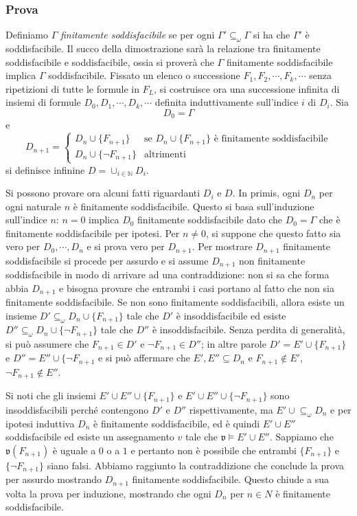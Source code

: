 \subsubsection{Prova}
Definiamo $\Gamma$ \textit{finitamente soddisfacibile} se per ogni $\Gamma' \subseteq_{\omega} \Gamma$ 
si ha che $\Gamma'$ è soddisfacibile. Il succo della dimostrazione sarà la relazione tra 
finitamente soddisfacibile e soddisfacibile, ossia 
si proverà che $\Gamma$ finitamente soddisfacibile implica $\Gamma$ soddisfacibile. 
Fissato un elenco o successione $F_1, F_2, \cdots, F_k, \cdots$ senza 
ripetizioni di tutte le formule in $F_L$, si costruisce ora una successione 
infinita di insiemi di formule $D_0, D_1, \cdots, D_k, \cdots$ definita induttivamente
sull'indice $i$ di $D_i$. Sia 
$$
D_0 = \Gamma
$$ 
e 
$$
D_{n+1} = 
\begin{cases} 
  D_n \cup \{F_{n+1}\} & \text{se } D_n \cup \{F_{n+1}\} \text{ è finitamente soddisfacibile} \\
  D_n \cup \{\neg F_{n+1}\} & \text{altrimenti}
\end{cases}
$$
si definisce infinine $D = \cup_{i \in \mathbb{N}} D_i$. 

Si possono provare ora alcuni fatti riguardanti $D_i$ e $D$. In primis, 
ogni $D_n$ per ogni naturale $n$ è finitamente soddisfacibile. Questo si basa 
sull'induzione sull'indice $n$: $n = 0$ implica $D_0$ finitamente soddisfacibile 
dato che $D_0 = \Gamma$ che è finitamente soddisfacibile per ipotesi. Per $n \neq 0$, si suppone 
che questo fatto sia vero per $D_0, \cdots, D_n$ e si prova vero per $D_{n+1}$. 
Per mostrare $D_{n+1}$ finitamente soddisfacibile si procede per assurdo e si assume 
$D_{n+1}$ non finitamente soddisfacibile in modo di arrivare ad una contraddizione: 
non si sa che forma abbia $D_{n+1}$ e bisogna provare che entrambi i casi 
portano al fatto che non sia finitamente soddisfacibile. Se non sono finitamente 
soddisfacibili, allora esiste un insieme $D' \subseteq_{\omega} D_{n}\cup \{F_{n+1}\}$ 
tale che $D'$ è insoddisfacibile ed esiste $D''\subseteq_{\omega} D_{n} \cup \{\neg F_{n+1}\}$
tale che $D''$ è insoddisfacibile. Senza perdita di generalità, si può assumere che 
$F_{n+1} \in D'$ e $\neg F_{n+1} \in D''$; in altre parole $D' = E' \cup \{F_{n+1}\}$ 
e $D'' = E'' \cup \{\neg F_{n+1}$ e si può affermare che $E', E'' \subseteq D_{n}$ 
e $F_{n+1} \notin E'$, $\neg F_{n+1} \notin E''$.

Si noti che gli insiemi $E' \cup E'' \cup \{F_{n+1}\}$ e $E' \cup E'' \cup 
\{\neg F_{n+1}\}$ sono insoddisfacibili perché contengono $D'$ e $D''$ rispettivamente, 
ma $E' \cup \subseteq_{\omega} D_{n}$ e per ipotesi induttiva $D_n$ è 
finitamente soddisfacibile, ed è quindi $E' \cup E''$ soddisfacibile ed esiste 
un assegnamento $v$ tale che $\mathfrak{v} \models E' \cup E''$. Sappiamo che 
$\mathfrak{v}(F_{n+1})$ è uguale a $0$ o a $1$ e pertanto non è possibile che entrambi
$\{F_{n+1}\}$ e $\{\neg F_{n+1}\}$ siano falsi. 
Abbiamo raggiunto la contraddizione che conclude la prova per assurdo 
mostrando $D_{n+1}$ finitamente soddisfacibile. Questo chiude a sua volta la 
prova per induzione, mostrando che ogni $D_n$ per $n \in N$ è finitamente 
soddisfacibile. 
 
